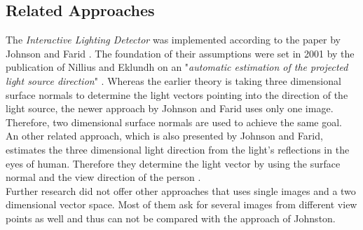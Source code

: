 \subsection{Related Approaches} \label{sec:otherApproaches}
The \textit{Interactive Lighting Detector} was implemented according to the paper by Johnson and Farid \cite{Johnson}. The foundation of their assumptions were set in 2001 by the publication of Nillius and Eklundh on an "\textit{automatic estimation of the projected light source direction}" \cite{990650}. Whereas the earlier theory is taking three dimensional surface normals to determine the light vectors pointing into the direction of the light source, the newer approach by Johnson and Farid uses only one image. Therefore, two dimensional surface normals are used to achieve the same goal. \\
An other related approach, which is also presented by Johnson and Farid, estimates the three dimensional light direction from the light's reflections in the eyes of human. Therefore they determine the light vector by using the surface normal and the view direction of the person \cite{johnson06specular}.
\\ Further research did not offer other approaches that uses single images and a two dimensional vector space. Most of them ask for several images from different view points as well and thus can not be compared with the approach of Johnston.

\newpage
